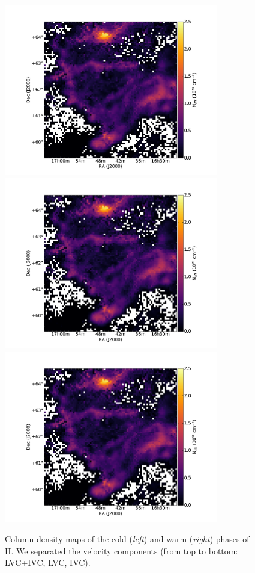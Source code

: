 \documentclass[traditabstract]{aa}
\begin{document}
\begin{figure}[h]
   \hspace{5mm}
   \includegraphics[page=5,height=7.5cm,trim=110 35 105 75,clip=true]{Figures/Phases_GHIGLS/GHIGLS_NHI.pdf} \\
   \vspace{5mm}
   \includegraphics[page=3,height=7.5cm,trim=110 35 105 75,clip=true]{Figures/Phases_GHIGLS/GHIGLS_NHI.pdf}
   \hspace{5mm}
   \includegraphics[page=6,height=7.5cm,trim=110 35 105 75,clip=true]{Figures/Phases_GHIGLS/GHIGLS_NHI.pdf}
   \caption{\label{Phases_GHIGLS} Column density maps of the cold (\emph{left}) and warm (\emph{right}) phases of H. We separated the velocity components (from top to bottom: LVC+IVC, LVC, IVC).}
 \end{figure}
\end{document}
